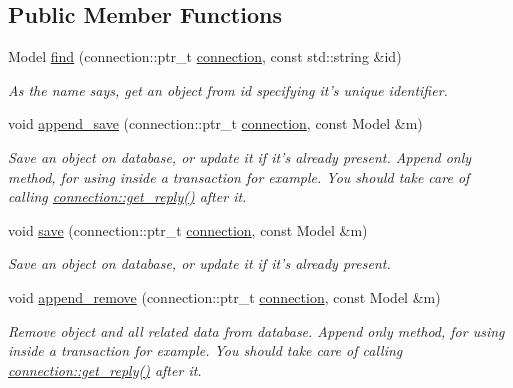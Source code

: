 \subsection*{Public Member Functions}
\begin{DoxyCompactItemize}
\item 
Model \hyperlink{classredis3m_1_1patterns_1_1simple__obj__store_a560eb243d85577507187b96382079b8c}{find} (connection\-::ptr\-\_\-t \hyperlink{classredis3m_1_1connection}{connection}, const std\-::string \&id)
\begin{DoxyCompactList}\small\item\em As the name says, get an object from id specifying it's unique identifier. \end{DoxyCompactList}\item 
void \hyperlink{classredis3m_1_1patterns_1_1simple__obj__store_ad172c8d799f52283c3aa095b56d6dd90}{append\-\_\-save} (connection\-::ptr\-\_\-t \hyperlink{classredis3m_1_1connection}{connection}, const Model \&m)
\begin{DoxyCompactList}\small\item\em Save an object on database, or update it if it's already present. Append only method, for using inside a transaction for example. You should take care of calling \hyperlink{classredis3m_1_1connection_a0c01abebb9be6368d3d159d30522e8c2}{connection\-::get\-\_\-reply()} after it. \end{DoxyCompactList}\item 
void \hyperlink{classredis3m_1_1patterns_1_1simple__obj__store_aee3756687827df5e8023f6d0ab59eff3}{save} (connection\-::ptr\-\_\-t \hyperlink{classredis3m_1_1connection}{connection}, const Model \&m)
\begin{DoxyCompactList}\small\item\em Save an object on database, or update it if it's already present. \end{DoxyCompactList}\item 
void \hyperlink{classredis3m_1_1patterns_1_1simple__obj__store_af13ee9626de8f4cfeda377d2ac24c9f3}{append\-\_\-remove} (connection\-::ptr\-\_\-t \hyperlink{classredis3m_1_1connection}{connection}, const Model \&m)
\begin{DoxyCompactList}\small\item\em Remove object and all related data from database. Append only method, for using inside a transaction for example. You should take care of calling \hyperlink{classredis3m_1_1connection_a0c01abebb9be6368d3d159d30522e8c2}{connection\-::get\-\_\-reply()} after it. \end{DoxyCompactList}\item 

\end{DoxyCompactItemize}
